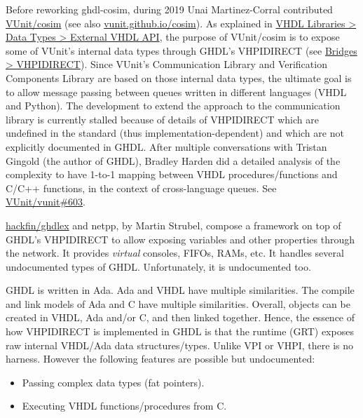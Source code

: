 \documentclass[
]{article}
\providecommand{\tightlist}{%
  \setlength{\itemsep}{0pt}\setlength{\parskip}{0pt}}
\begin{document}
Before reworking ghdl-cosim, during 2019 Unai Martinez-Corral contributed \href{https://github.com/VUnit/cosim}{VUnit/cosim} (see also \href{https://vunit.github.io/cosim/index.html}{vunit.github.io/cosim}). As explained in \href{https://vunit.github.io/data_types/user_guide.html\#external-vhdl-api}{VHDL Libraries \textgreater{} Data Types \textgreater{} External VHDL API}, the purpose of VUnit/cosim is to expose some of VUnit's internal data types through GHDL's VHPIDIRECT (see \href{https://vunit.github.io/cosim/bridges/vhpidirect.html\#bridges-vhpidirect}{Bridges \textgreater{} VHPIDIRECT}). Since VUnit's Communication Library and Verification Components Library are based on those internal data types, the ultimate goal is to allow message passing between queues written in different languages (VHDL and Python). The development to extend the approach to the communication library is currently stalled because of details of VHPIDIRECT which are undefined in the standard (thus implementation-dependent) and which are not explicitly documented in GHDL. After multiple conversations with Tristan Gingold (the author of GHDL), Bradley Harden did a detailed analysis of the complexity to have 1-to-1 mapping between VHDL procedures/functions and C/C++ functions, in the context of cross-language queues. See \href{https://github.com/VUnit/vunit/issues/603}{VUnit/vunit\#603}.

\href{https://github.com/hackfin/ghdlex}{hackfin/ghdlex} and netpp, by Martin Strubel, compose a framework on top of GHDL's VHPIDIRECT to allow exposing variables and other properties through the network. It provides \emph{virtual} consoles, FIFOs, RAMs, etc. It handles several undocumented types of GHDL. Unfortunately, it is undocumented too.

GHDL is written in Ada. Ada and VHDL have multiple similarities. The compile and link models of Ada and C have multiple similarities. Overall, objects can be created in VHDL, Ada and/or C, and then linked together. Hence, the essence of how VHPIDIRECT is implemented in GHDL is that the runtime (GRT) exposes raw internal VHDL/Ada data structures/types. Unlike VPI or VHPI, there is no harness. However the following features are possible but undocumented:

\begin{itemize}
\tightlist
\item
  Passing complex data types (fat pointers).
\item
  Executing VHDL functions/procedures from C.
\end{itemize}
\end{document}
